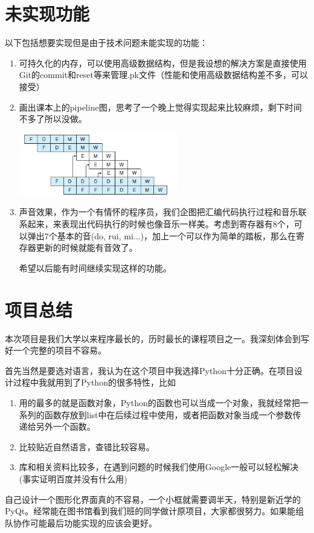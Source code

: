 \documentclass{article}
\begin{document}
\section{未实现功能}
以下包括想要实现但是由于技术问题未能实现的功能：
\begin{enumerate}
\item 可持久化的内存，可以使用高级数据结构，但是我设想的解决方案是直接使用Git的commit和reset等来管理.pk文件（性能和使用高级数据结构差不多，可以接受）
\item 画出课本上的pipeline图，思考了一个晚上觉得实现起来比较麻烦，剩下时间不多了所以没做。
\begin{center}
\includegraphics[width = 7cm]{8.jpg}
\end{center}
\item 声音效果，作为一个有情怀的程序员，我们企图把汇编代码执行过程和音乐联系起来，来表现出代码执行的时候也像音乐一样美。考虑到寄存器有8个，可以弹出7个基本的音(do, rui, mi...)，加上一个可以作为简单的踏板，那么在寄存器更新的时候就能有音效了。

希望以后能有时间继续实现这样的功能。
\end{enumerate}

\section{项目总结}
本次项目是我们大学以来程序最长的，历时最长的课程项目之一。我深刻体会到写好一个完整的项目不容易。

首先当然是要选对语言，我认为在这个项目中我选择Python十分正确。在项目设计过程中我就用到了Python的很多特性，比如
\begin{enumerate}
\item 用的最多的就是函数对象，Python的函数也可以当成一个对象，我就经常把一系列的函数存放到list中在后续过程中使用，或者把函数对象当成一个参数传递给另外一个函数。
\item 比较贴近自然语言，查错比较容易。
\item 库和相关资料比较多，在遇到问题的时候我们使用Google一般可以轻松解决(事实证明百度并没有什么用)
\end{enumerate}

自己设计一个图形化界面真的不容易，一个小框就需要调半天，特别是新近学的PyQt。经常能在图书馆看到我们班的同学做计原项目，大家都很努力。如果能组队协作可能最后功能实现的应该会更好。
\end{document}
